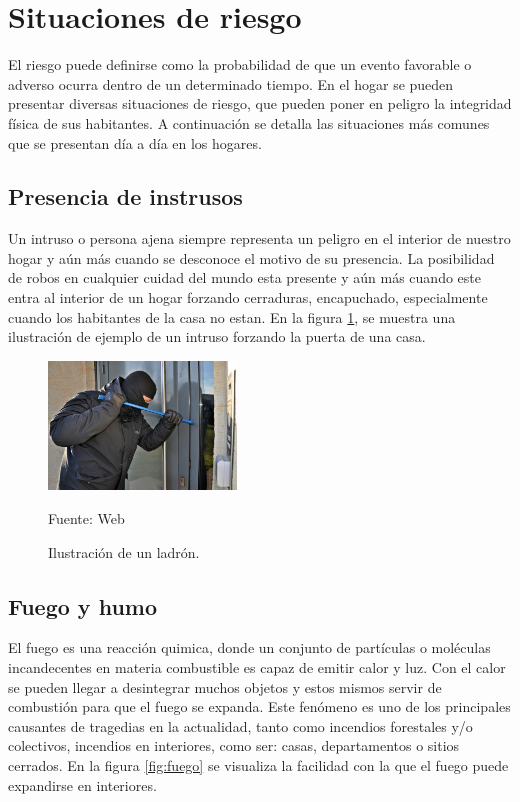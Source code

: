 \section{Situaciones de riesgo}
El riesgo puede definirse como la probabilidad de que un evento favorable o adverso ocurra dentro de un determinado tiempo. En el hogar se pueden presentar diversas situaciones de riesgo, que pueden poner en peligro la integridad física de sus habitantes. A continuación se detalla las situaciones más comunes que se presentan día a día en los hogares.
\subsection{Presencia de instrusos}
Un intruso o persona ajena siempre representa un peligro en el interior de nuestro hogar y aún más cuando se desconoce el motivo de su presencia. La posibilidad de robos en cualquier cuidad del mundo esta presente y aún más cuando este entra al interior de un hogar forzando cerraduras, encapuchado, especialmente cuando los habitantes de la casa no estan. En la figura \ref{fig:ladron}, se muestra una ilustración de ejemplo de un intruso forzando la puerta de una casa.\\

\begin{figure}[H]
    \begin{center}
        \includegraphics[width=5cm]{img/capitulo_3/burglar.jpg}
    \end{center}
    \begin{center}
        \caption{Ilustración de un ladrón.} 
        Fuente: Web
        \label{fig:ladron}
    \end{center}
\end{figure}

\subsection{Fuego y humo}
El fuego es una reacción quimica, donde un conjunto de partículas o moléculas incandecentes en materia combustible es capaz de emitir calor y luz. Con el calor se pueden llegar a desintegrar muchos objetos y estos mismos servir de combustión para que el fuego se expanda.
Este fenómeno es uno de los principales causantes de tragedias en la actualidad, tanto como incendios forestales y/o colectivos, incendios en interiores, como ser: casas, departamentos o sitios cerrados. En la figura \ref{fig:fuego} se visualiza la facilidad con la que el fuego puede expandirse en interiores.\\


